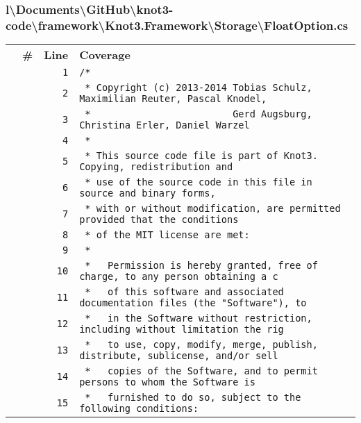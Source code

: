 \documentclass[a4paper,10pt]{article}
\begin{document}
\subsubsection{l\textbackslash Documents\textbackslash GitHub\textbackslash knot3-code\textbackslash framework\textbackslash Knot3.Framework\textbackslash Storage\textbackslash FloatOption.cs}
\begin{longtable}[l]{lrrl}
\textbf{} & \textbf{\#} & \textbf{Line} & \textbf{Coverage}\\
\cellcolor{gray} &  & \verb~1~ & \verb~/*~\\
\cellcolor{gray} &  & \verb~2~ & \verb~ * Copyright (c) 2013-2014 Tobias Schulz, Maximilian Reuter, Pascal Knodel,~\\
\cellcolor{gray} &  & \verb~3~ & \verb~ *                         Gerd Augsburg, Christina Erler, Daniel Warzel~\\
\cellcolor{gray} &  & \verb~4~ & \verb~ *~\\
\cellcolor{gray} &  & \verb~5~ & \verb~ * This source code file is part of Knot3. Copying, redistribution and~\\
\cellcolor{gray} &  & \verb~6~ & \verb~ * use of the source code in this file in source and binary forms,~\\
\cellcolor{gray} &  & \verb~7~ & \verb~ * with or without modification, are permitted provided that the conditions~\\
\cellcolor{gray} &  & \verb~8~ & \verb~ * of the MIT license are met:~\\
\cellcolor{gray} &  & \verb~9~ & \verb~ *~\\
\cellcolor{gray} &  & \verb~10~ & \verb~ *   Permission is hereby granted, free of charge, to any person obtaining a c~\\
\cellcolor{gray} &  & \verb~11~ & \verb~ *   of this software and associated documentation files (the "Software"), to ~\\
\cellcolor{gray} &  & \verb~12~ & \verb~ *   in the Software without restriction, including without limitation the rig~\\
\cellcolor{gray} &  & \verb~13~ & \verb~ *   to use, copy, modify, merge, publish, distribute, sublicense, and/or sell~\\
\cellcolor{gray} &  & \verb~14~ & \verb~ *   copies of the Software, and to permit persons to whom the Software is~\\
\cellcolor{gray} &  & \verb~15~ & \verb~ *   furnished to do so, subject to the following conditions:~\\

\end{longtable}
\end{document}
